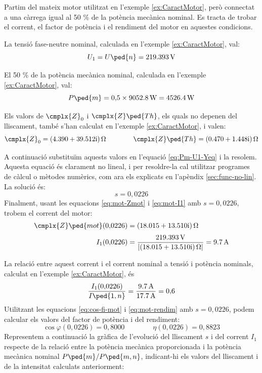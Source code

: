 \begin{exemple}\label{ex:MotCarregaReduida}
	\addcontentsxms{\MotCarregaReduida}
	Partim del mateix motor utilitzat en l'exemple \vref{ex:CaractMotor}, però connectat a una càrrega igual  al 50 \% de la potència mecànica nominal. Es tracta de trobar el corrent, el factor de potència i el rendiment del motor en aquestes condicions.

	La tensió  fase-neutre  nominal, calculada  en l'exemple \ref{ex:CaractMotor}, val: 
	\[
		U_1 = U\ped{n} = \qty{219,393}{V}
	\]
	
	El 50 \% de la potència mecànica nominal, calculada  en l'exemple \ref{ex:CaractMotor}, val:
	\[
		P\ped{m} =  0{,}5\times\qty{9052,8}{W} = \qty{4526,4}{W}
	\]

	Els valors de $\cmplx{Z}_0$ i  $\cmplx{Z}\ped{Th}$, els quals no depenen del lliscament, també s'han calculat en  l'exemple \ref{ex:CaractMotor}, i valen:
	\[
       \cmplx{Z}_0 =  \complexqty{4,390+j39,512}{\ohm} 
       \qquad \qquad
       \cmplx{Z}\ped{Th} = \complexqty{0,470+j1,448}{\ohm} 
	\]
	
	A continuació  substituïm aquests valors en l'equació \eqref{eq:Pm-U1-Yeq} i la resolem.  Aquesta equació és clarament no lineal, i per resoldre-la cal utilitzar programes de càlcul o mètodes numèrics, com ara els explicats en l'apèndix \ref{sec:func-no-lin}. La solució és:
	\[
		s = 0{,}0226
	\]
	Finalment, usant les equacions \eqref{eq:mot-Zmot} i \eqref{eq:mot-I1} amb $s  = 0{,}0226$,  trobem el corrent del motor:
	\begin{align*}
	\cmplx{Z}\ped{mot}(0{,}0226) &=  \complexqty{18,015+j13,510}{\ohm} \\[0.5ex]
	I_1(0{,}0226) &= \frac{\qty{219,393}{V}}{|\complexqty{18,015+j13,510}{\ohm}|} = \qty{9,7}{A}
	\end{align*}
	
	La relació entre aquest  corrent i el corrent nominal a tensió i potència nominals, calculat en l'exemple \ref{ex:CaractMotor}, és
	\[
	\frac{I_1(0{,}0226)}{I\ped{1,n}} = \frac{\qty{9,7}{A}}{\qty{17,7}{A}} = 0{,}6
	\]
	Utilitzant les equacions  \eqref{eq:cos-fi-mot} i \eqref{eq:mot-rendim} amb $s  = 0{,}0226$, podem calcular els valors del factor de potència i del rendiment:
	\[
		\cos\varphi(0{,}0226) =  0{,}8000 \qquad \qquad
		\eta(0{,}0226) =  0{,}8823
	\]
	Representem a continuació la gràfica de l'evolució del lliscament $s$ i del corrent $I_1$ respecte de la relació entre la potència mecànica proporcionada i la potència mecànica nominal $P\ped{m}/P\ped{m,n}$, indicant-hi els valors del lliscament i de la intensitat calculats anteriorment:
	\begin{center}
		
	\end{center}


\end{exemple}
